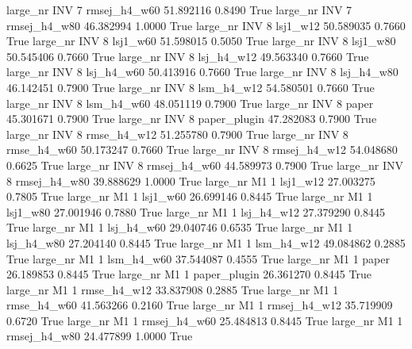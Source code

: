   large_nr      INV                 7 rmsej_h4_w60   51.892116      0.8490    True
  large_nr      INV                 7 rmsej_h4_w80   46.382994      1.0000    True
  large_nr      INV                 8     lsj1_w12   50.589035      0.7660    True
  large_nr      INV                 8     lsj1_w60   51.598015      0.5050    True
  large_nr      INV                 8     lsj1_w80   50.545406      0.7660    True
  large_nr      INV                 8   lsj_h4_w12   49.563340      0.7660    True
  large_nr      INV                 8   lsj_h4_w60   50.413916      0.7660    True
  large_nr      INV                 8   lsj_h4_w80   46.142451      0.7900    True
  large_nr      INV                 8   lsm_h4_w12   54.580501      0.7660    True
  large_nr      INV                 8   lsm_h4_w60   48.051119      0.7900    True
  large_nr      INV                 8        paper   45.301671      0.7900    True
  large_nr      INV                 8 paper_plugin   47.282083      0.7900    True
  large_nr      INV                 8  rmse_h4_w12   51.255780      0.7900    True
  large_nr      INV                 8  rmse_h4_w60   50.173247      0.7660    True
  large_nr      INV                 8 rmsej_h4_w12   54.048680      0.6625    True
  large_nr      INV                 8 rmsej_h4_w60   44.589973      0.7900    True
  large_nr      INV                 8 rmsej_h4_w80   39.888629      1.0000    True
  large_nr       M1                 1     lsj1_w12   27.003275      0.7805    True
  large_nr       M1                 1     lsj1_w60   26.699146      0.8445    True
  large_nr       M1                 1     lsj1_w80   27.001946      0.7880    True
  large_nr       M1                 1   lsj_h4_w12   27.379290      0.8445    True
  large_nr       M1                 1   lsj_h4_w60   29.040746      0.6535    True
  large_nr       M1                 1   lsj_h4_w80   27.204140      0.8445    True
  large_nr       M1                 1   lsm_h4_w12   49.084862      0.2885    True
  large_nr       M1                 1   lsm_h4_w60   37.544087      0.4555    True
  large_nr       M1                 1        paper   26.189853      0.8445    True
  large_nr       M1                 1 paper_plugin   26.361270      0.8445    True
  large_nr       M1                 1  rmse_h4_w12   33.837908      0.2885    True
  large_nr       M1                 1  rmse_h4_w60   41.563266      0.2160    True
  large_nr       M1                 1 rmsej_h4_w12   35.719909      0.6720    True
  large_nr       M1                 1 rmsej_h4_w60   25.484813      0.8445    True
  large_nr       M1                 1 rmsej_h4_w80   24.477899      1.0000    True
